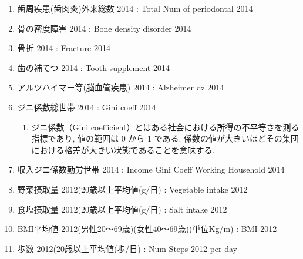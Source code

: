 \begin{multicols}{2}
\begin{enumerate}
  \item 歯周疾患(歯肉炎)外来総数 2014  :  Total Num of periodontal 2014
  \item 骨の密度障害 2014  :  Bone density disorder 2014
  \item 骨折 2014  :  Fracture 2014
  \item 歯の補てつ 2014  :  Tooth supplement 2014
  \item アルツハイマー等(脳血管疾患) 2014  :  Alzheimer dz 2014
  \item ジニ係数総世帯 2014  :  Gini coeff 2014
  \begin{enumerate}
  \item ジニ係数（Gini coefficient）とはある社会における所得の不平等さを測る指標であり, 
値の範囲は 0 から 1 である.
係数の値が大きいほどその集団における格差が大きい状態であることを意味する.
  \end{enumerate}
  \item 収入ジニ係数勤労世帯 2014  :  Income Gini Coeff Working Household 2014
  \item 野菜摂取量 2012(20歳以上平均値(g/日)  :  Vegetable intake 2012
  \item 食塩摂取量 2012(20歳以上平均値(g/日)  :  Salt intake 2012
  \item BMI平均値 2012(男性20〜69歳)(女性40〜69歳)(単位Kg/m)  :  BMI 2012
  \item 歩数 2012(20歳以上平均値(歩/日)  :  Num Steps 2012 per day
\end{enumerate}


\end{multicols}


%
%



